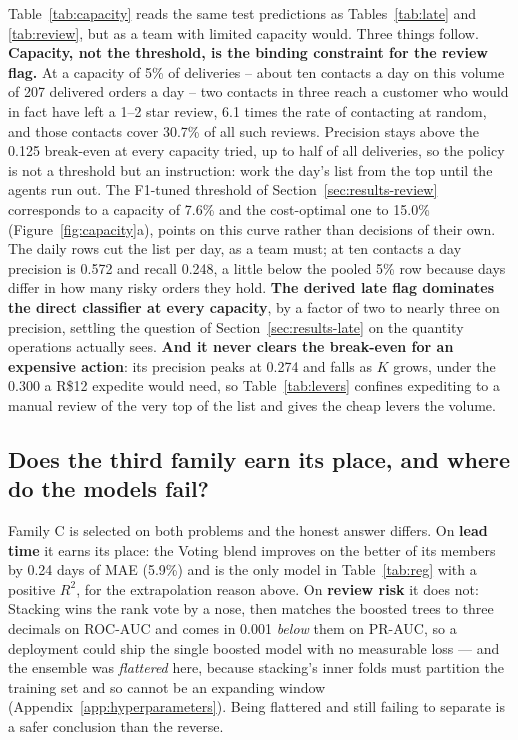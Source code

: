 Table~\ref{tab:capacity} reads the same test predictions as
Tables~\ref{tab:late} and \ref{tab:review}, but as a team with limited capacity
would. Three things follow. \textbf{Capacity, not the threshold, is the binding
constraint for the review flag.} At a capacity of 5\% of deliveries -- about ten
contacts a day on this volume of 207 delivered orders a day -- two contacts in
three reach a customer who would in fact have left a 1--2 star review, 6.1
times the rate of contacting at random, and those contacts cover 30.7\% of all
such reviews. Precision stays above the 0.125 break-even at every capacity
tried, up to half of all deliveries, so the policy is not a threshold but an
instruction: work the day's list from the top until the agents run out. The
F1-tuned threshold of Section~\ref{sec:results-review} corresponds to a capacity
of 7.6\% and the cost-optimal one to 15.0\% (Figure~\ref{fig:capacity}a), points
on this curve rather than decisions of their own. The daily rows cut the list
per day, as a team must; at ten contacts a day precision is 0.572 and recall
0.248, a little below the pooled 5\% row because days differ in how many risky
orders they hold. \textbf{The derived late flag dominates the direct classifier
at every capacity}, by a factor of two to nearly three on precision, settling
the question of Section~\ref{sec:results-late} on the quantity operations
actually sees. \textbf{And it never clears the break-even for an expensive
action}: its precision peaks at 0.274 and falls as $K$ grows, under the 0.300 a
R\$12 expedite would need, so Table~\ref{tab:levers} confines expediting to a
manual review of the very top of the list and gives the cheap levers the volume.

\subsection{Does the third family earn its place, and where do the models fail?}
\label{sec:results-ensemble}

Family C is selected on both problems and the honest answer differs. On
\textbf{lead time} it earns its place: the Voting blend improves on the better of
its members by 0.24 days of MAE (5.9\%) and is the only model in
Table~\ref{tab:reg} with a positive $R^2$, for the extrapolation reason above. On
\textbf{review risk} it does not: Stacking wins the rank vote by a nose, then
matches the boosted trees to three decimals on ROC-AUC and comes in 0.001
\emph{below} them on PR-AUC, so a deployment could ship the single boosted model
with no measurable loss --- and the ensemble was \emph{flattered} here, because
stacking's inner folds must partition the training set and so cannot be an
expanding window (Appendix~\ref{app:hyperparameters}). Being flattered and
still failing to separate is a safer conclusion than the reverse.

